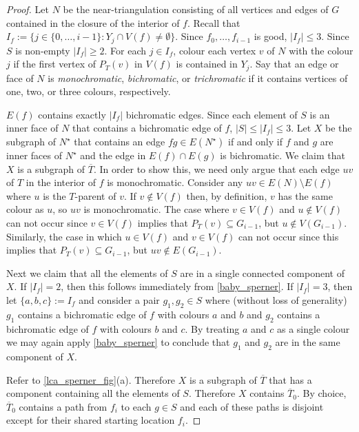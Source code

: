 \documentclass[a4paper,UKenglish,autoref]{lipics-v2021}
\begin{document}
\begin{proof}
  Let $N$ be the near-triangulation consisting of all vertices and edges of $G$ contained in the closure of the interior of $f$.  Recall that $I_f:=\{j\in\{0,\ldots,i-1\}: Y_j\cap V(f)\neq\emptyset\}$.  Since $f_0,\ldots,f_{i-1}$ is good, $|I_f|\le 3$.  Since $S$ is non-empty $|I_f|\ge 2$.  For each $j\in I_f$, colour each vertex $v$ of $N$ with the colour $j$ if the first vertex of $P_{T}(v)$ in $V(f)$ is contained in $Y_j$.  Say that an edge or face of $N$ is \emph{monochromatic}, \emph{bichromatic}, or \emph{trichromatic} if it contains vertices of one, two, or three colours, respectively.

  $E(f)$ contains exactly $|I_f|$ bichromatic edges.  Since each element of $S$ is an inner face of $N$ that contains a bichromatic edge of $f$, $|S|\le |I_f|\le 3$.  Let $X$ be the subgraph of $N^\star$ that contains an edge $fg\in E(N^\star)$ if and only if $f$ and $g$ are inner faces of $N^\star$ and the edge in $E(f)\cap E(g)$ is bichromatic.  We claim that $X$ is a subgraph of $\overline{T}$.  In order to show this, we need only argue that each edge $uv$ of $T$ in the interior of $f$ is monochromatic.  Consider any $uv\in E(N)\setminus E(f)$ where $u$ is the $T$-parent of $v$.  If $v\not\in V(f)$ then, by definition, $v$ has the same colour as $u$, so $uv$ is monochromatic. The case where $v\in V(f)$ and $u\not\in V(f)$ can not occur since $v\in V(f)$ implies that $P_T(v)\subseteq G_{i-1}$, but $u\not\in V(G_{i-1})$.  Similarly, the case in which $u\in V(f)$ and $v\in V(f)$ can not occur since this implies that $P_T(v)\subseteq G_{i-1}$, but $uv\not\in E(G_{i-1})$.

  Next we claim that all the elements of $S$ are in a single connected component of $X$.  If $|I_f|=2$, then this follows immediately from \cref{baby_sperner}.  If $|I_f|=3$, then let $\{a,b,c\}:=I_f$ and consider a pair $g_1,g_2\in S$ where (without loss of generality) $g_1$ contains a bichromatic edge of $f$ with colours $a$ and $b$ and $g_2$ contains a bichromatic edge of $f$ with colours $b$ and $c$.  By treating $a$ and $c$ as a single colour we may again apply \cref{baby_sperner} to conclude that $g_1$ and $g_2$ are in the same component of $X$.

  Refer to \cref{lca_sperner_fig}(a).
  Therefore $X$ is a subgraph of $\overline{T}$ that has a component containing all the elements of $S$. Therefore $X$ contains $\overline{T}_0$.  By choice, $\overline{T}_0$ contains a path from $f_i$ to each $g\in S$ and each of these paths is disjoint except for their shared starting location $f_i$. 


\end{proof}
\end{document}
